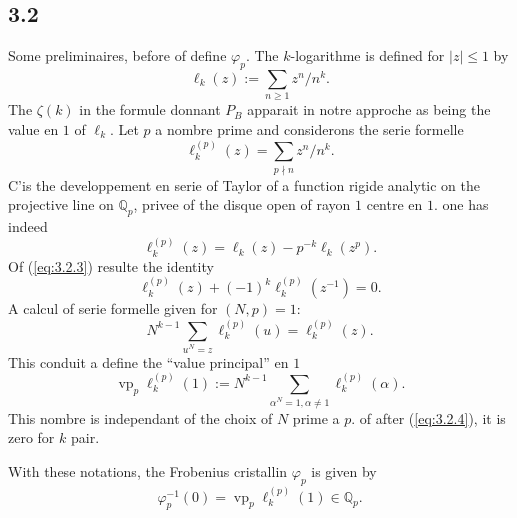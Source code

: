 \documentclass[12pt,a4paper]{article}
\theoremstyle{plain}
\theoremstyle{definition}
\theoremstyle{remark}
\begin{document}
\subsection*{3.2}

Some preliminaires, before of define $\varphi_p$. The $k$-logarithme is
defined for $|z| \leq 1$ by
\begin{equation}\label{eq:3.2.1}
\ell_k(z) := \sum_{n \geq 1} z^n/n^k.
\end{equation}
The $\zeta(k)$ in the formule donnant $P_B$ apparait in notre approche as being
the value en $1$ of $\ell_k$. Let $p$ a nombre prime and considerons the serie
formelle
\begin{equation}\label{eq:3.2.2}
\ell_k^{(p)}(z) = \sum_{p \nmid n} z^n/n^k.
\end{equation}
C'is the developpement en serie of Taylor of a function rigide analytic on the
projective line on $\mathbb{Q}_p$, privee of the disque open of rayon $1$ centre en
$1$. one has indeed
\begin{equation}\label{eq:3.2.3}
\ell_k^{(p)}(z) = \ell_k(z) - p^{-k} \ell_k(z^p).
\end{equation}
Of (\ref{eq:3.2.3}) resulte the identity
\begin{equation}\label{eq:3.2.4}
\ell_k^{(p)}(z) + (-1)^k \ell_k^{(p)}(z^{-1}) = 0.
\end{equation}
A calcul of serie formelle given for $(N,p) = 1$:
\begin{equation}\label{eq:3.2.5}
N^{k-1} \sum_{u^N=z} \ell_k^{(p)}(u) = \ell_k^{(p)}(z).
\end{equation}
This conduit a define the ``value principal'' en $1$
\begin{equation}\label{eq:3.2.6}
\operatorname{vp}_p \ell_k^{(p)}(1) := N^{k-1} \sum_{\alpha^N=1, \alpha \neq 1} \ell_k^{(p)}(\alpha).
\end{equation}
This nombre is independant of the choix of $N$ prime a $p$. of after
(\ref{eq:3.2.4}), it is zero for $k$ pair.

With these notations, the Frobenius cristallin $\varphi_p$ is given by
\begin{equation}\label{eq:3.2.7}
\varphi_p^{-1}(0) = \operatorname{vp}_p \ell_k^{(p)}(1) \in \mathbb{Q}_p.
\end{equation}
\end{document}
